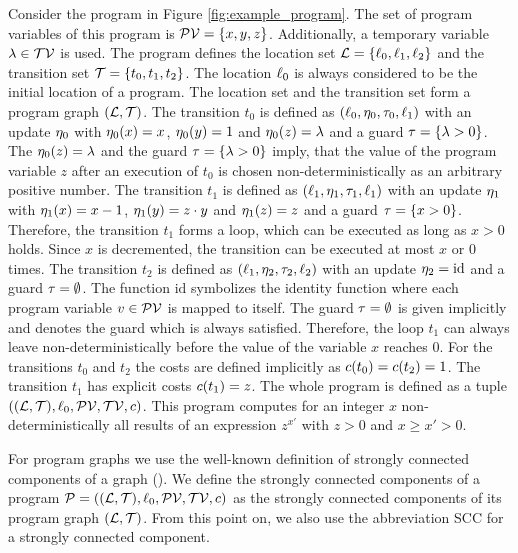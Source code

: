\begin{example}[Program]
  
  Consider the program in Figure \ref{fig:example_program}.
  The set of program variables of this program is $\mathcal{PV} = \lbrace x,y,z \rbrace$.
  Additionally, a temporary variable $\lambda \in \mathcal{TV}$ is used.
  The program defines the location set $\mathcal{L} = \lbrace \ell_0,\ell_1,\ell_2 \rbrace$ and the transition set $\mathcal{T} = \lbrace t_0,t_1,t_2 \rbrace$.
  The location $\ell_0$ is always considered to be the initial location of a program.
  The location set and the transition set form a program graph $(\mathcal{L}, \mathcal{T})$.
  The transition $t_0$ is defined as $(\ell_0,\eta_0,\tau_0,\ell_1)$ with an update $\eta_0$ with $\eta_0(x)=x$, $\eta_0(y)=1$ and $\eta_0(z)=\lambda$ and a guard $\tau = \lbrace \lambda > 0 \rbrace$.
  The $\eta_0(z)=\lambda$ and the guard $\tau = \lbrace \lambda > 0 \rbrace$ imply, that the value of the program variable $z$ after an execution of $t_0$ is chosen non-deterministically as an arbitrary positive number.
  The transition $t_1$ is defined as $(\ell_1,\eta_1,\tau_1,\ell_1)$ with an update $\eta_1$ with $\eta_1(x)=x-1$, $\eta_1(y)=z \cdot y$ and $\eta_1(z)=z$ and a guard $\tau = \lbrace x > 0 \rbrace$.
  Therefore, the transition $t_1$ forms a loop, which can be executed as long as $x > 0$ holds.
  Since $x$ is decremented, the transition can be executed at most $x$ or $0$ times.
  The transition $t_2$ is defined as $(\ell_1,\eta_2,\tau_2,\ell_2)$ with an update $\eta_2 = \text{id}$ and a guard $\tau = \emptyset$.
  The function $\text{id}$ symbolizes the identity function where each program variable $v \in \mathcal{PV}$ is mapped to itself.
  The guard $\tau = \emptyset$ is given implicitly and denotes the guard which is always satisfied.
  Therefore, the loop $t_1$ can always leave non-deterministically before the value of the variable $x$ reaches $0$.
  For the transitions $t_0$ and $t_2$ the costs are defined implicitly as $c(t_0) = c(t_2) = 1$.
  The transition $t_1$ has explicit costs $c(t_1) = z$.
  The whole program is defined as a tuple $((\mathcal{L}, \mathcal{T}), \ell_0, \mathcal{PV}, \mathcal{TV}, c)$.
  This program computes for an integer $x$ non-deterministically all results of an expression $z^{x'}$ with $z > 0$ and $x \geq x' > 0$.  
\end{example}

For program graphs we use the well-known definition of strongly connected components of a graph (\cite{sccs}).
We define the strongly connected components of a program $\mathcal{P} = ((\mathcal{L}, \mathcal{T}), \ell_0, \mathcal{PV}, \mathcal{TV}, c)$ as the strongly connected components of its program graph $(\mathcal{L}, \mathcal{T})$.
From this point on, we also use the abbreviation SCC for a strongly connected component.

